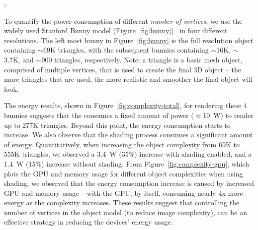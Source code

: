 
:

To quantify the power consumption of different \emph{number of vertices},
we use the widely used Stanford Bunny model (Figure~\ref{fig:bunny})~\cite{bunny} in four different resolutions. The left most bunny in Figure~\ref{fig:bunny} is
the full resolution object containing $\sim$69K triangles, with the subsequent 
bunnies containing $\sim$16K, $\sim$3.7K, and $\sim$900 triangles, respectively. Note: a triangle is a basic mesh object, comprised of multiple vertices, that is used to create the final 3D object -- the more triangles that are used, the more realistic and smoother the final object will look.


The energy results, shown in Figure~\ref{fig:complexity-total}, for rendering these 4 bunnies suggests that the \mlo consumes a fixed amount of power ($\approx$10~W) to render up to 277K triangles. Beyond this point, the 
energy consumption starts to increase. We also observe that the shading process consumes a significant amount of energy. Quantitatively, when increasing the object  complexity from 69K to 555K triangles, we observed a 3.4~W (35\%)  increase with shading enabled, and a 1.4~W (15\%) increase without shading. From 
Figure~\ref{fig:complexity-gpu}, which plots the GPU and memory usage 
for different object complexities when using shading, we observed that the energy consumption increase is caused by increased GPU and memory usage -- with the GPU, by itself, consuming nearly 4x more energy as the complexity increases. These results suggest that controlling the number of vertices in the object model (to reduce image complexity), can be an effective strategy in reducing the devices' energy usage.





